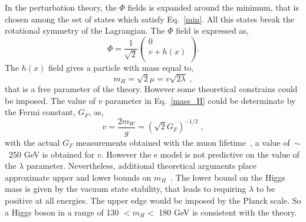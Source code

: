 In the perturbation theory, the $\Phi$ fields is expanded around the minimum, that is chosen among the set of states which satisfy Eq.~\ref{min}. All this states break the rotational symmetry of the Lagrangian.
The $\Phi$ field is expressed as, 
\begin{equation}
\Phi= \frac{1}{\sqrt{2}} 
\left(
\begin{array}{c}
0   \\
v +h(x) \\
\end{array}
\right) .
\end{equation}
The $h(x)$ field gives a particle with mass equal to,
\begin{equation}
m_H=\sqrt{2}\mu=v\sqrt{2 \lambda} \; ,
\label{mass_H}
\end{equation}
that is a free parameter of the theory. However some theoretical constrains could be imposed. The value of $v$ parameter in Eq.~\ref{mass_H} could be determinate by the Fermi constant, $G_F$, as,
\begin{equation}
v=\frac{2m_W}{g}=(\sqrt{2} G_F)^{-1/2} \; ,
\end{equation}
with the actual $G_F$ measurements obtained with the muon lifetime~\cite{vanRitbergen:1999fi}, a value  of~$\sim$~250 GeV is obtained for  $v$. However the e model is not predictive on the value of the $\lambda$ parameter. Nevertheless, additional theoretical arguments place approximate upper and
lower bounds on $m_H$~\cite{Beringer:1900zz}. The lower bound on the Higgs mass is given by  the vacuum state stability, that leads to requiring $\lambda$ to be
positive at all energies. The upper edge would be imposed by the Planck scale. So a Higgs boson in a range of 130 $<m_H<$ 180 GeV is consistent with the theory.
 
